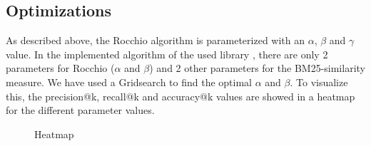 \documentclass[11pt]{article}
\begin{document}
\subsection{Optimizations}
As described above, the \textsf{Rocchio} algorithm is parameterized with an $\alpha$, $\beta$ and $\gamma$ value. In the implemented algorithm of the used library \cite{rocchio}, there are only 2 parameters for \textsf{Rocchio} ($\alpha$ and $\beta$) and 2 other parameters for the BM25-similarity measure. We have used a Gridsearch to find the optimal $\alpha$ and $\beta$. To visualize this, the precision@k, recall@k and accuracy@k values are showed in a heatmap for the different parameter values.

\begin{figure}[htp]
	\centering
	\hfill
	\par 
	\caption{Heatmap}
	\label{fig:heatmap}
\end{figure}
\end{document}
